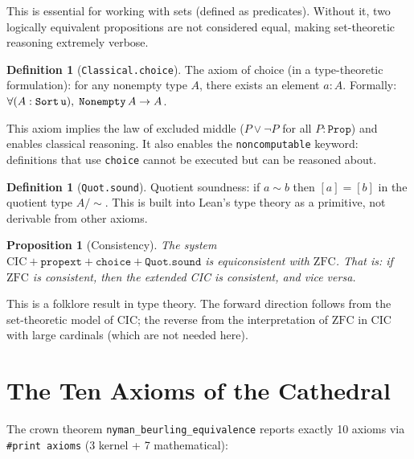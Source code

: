 \documentclass[11pt,a4paper]{article}
\theoremstyle{plain}
\newtheorem{proposition}[theorem]{Proposition}
\theoremstyle{definition}
\newtheorem{definition}[theorem]{Definition}
\newcommand{\lean}[1]{\texttt{#1}}
\newcommand{\CIC}{\mathrm{CIC}}
\newcommand{\ZFC}{\mathrm{ZFC}}
\begin{document}
This is essential for working with sets (defined as predicates).
Without it, two logically equivalent propositions are not considered
equal, making set-theoretic reasoning extremely verbose.

\begin{definition}[\lean{Classical.choice}]
The axiom of choice (in a type-theoretic formulation): for any
nonempty type $A$, there exists an element $a : A$. Formally:
$\forall (A : \lean{Sort\,u}),\; \lean{Nonempty}\,A \to A$.
\end{definition}

This axiom implies the law of excluded middle ($P \lor \neg P$ for
all $P : \lean{Prop}$) and enables classical reasoning. It also
enables the \lean{noncomputable} keyword: definitions that use
\lean{choice} cannot be executed but can be reasoned about.

\begin{definition}[\lean{Quot.sound}]
Quotient soundness: if $a \sim b$ then $[a] = [b]$ in the quotient
type $A / \sim$. This is built into Lean's type theory as a
primitive, not derivable from other axioms.
\end{definition}

\begin{proposition}[Consistency]
\label{prop:consistency}
The system $\CIC + \lean{propext} + \lean{choice} + \lean{Quot.sound}$
is equiconsistent with $\ZFC$. That is: if $\ZFC$ is consistent,
then the extended CIC is consistent, and vice versa.
\end{proposition}

This is a folklore result in type theory. The forward direction
follows from the set-theoretic model of CIC; the reverse from
the interpretation of $\ZFC$ in CIC with large cardinals
(which are not needed here).

\section{The Ten Axioms of the Cathedral}
\label{sec:axioms}

The crown theorem \lean{nyman\_beurling\_equivalence} reports exactly
10 axioms via \lean{\#print axioms} (3 kernel + 7 mathematical):
\end{document}

